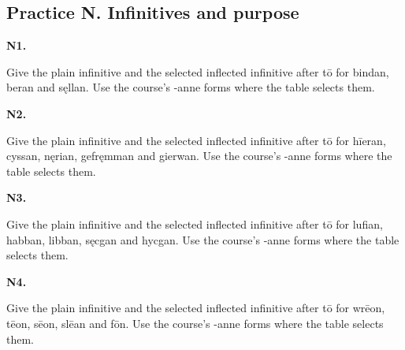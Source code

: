 \subsection*{Practice N. Infinitives and purpose}

\par\begin{minipage}{\linewidth}\raggedright
\textbf{N1.}

Give the plain infinitive and the selected inflected infinitive after tō for bindan, beran and sęllan. Use the course’s -anne forms where the table selects them.

\end{minipage}\par\addvspace{4pt}

\par\begin{minipage}{\linewidth}\raggedright
\textbf{N2.}

Give the plain infinitive and the selected inflected infinitive after tō for hīeran, cyssan, nęrian, gefręmman and gierwan. Use the course’s -anne forms where the table selects them.

\end{minipage}\par\addvspace{4pt}

\par\begin{minipage}{\linewidth}\raggedright
\textbf{N3.}

Give the plain infinitive and the selected inflected infinitive after tō for lufian, habban, libban, sęcgan and hycgan. Use the course’s -anne forms where the table selects them.

\end{minipage}\par\addvspace{4pt}

\par\begin{minipage}{\linewidth}\raggedright
\textbf{N4.}

Give the plain infinitive and the selected inflected infinitive after tō for wrēon, tēon, sēon, slēan and fōn. Use the course’s -anne forms where the table selects them.

\end{minipage}\par\addvspace{4pt}

